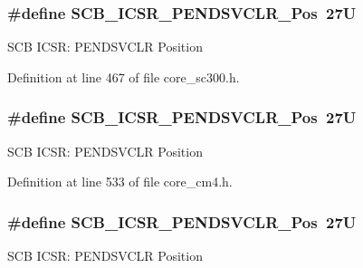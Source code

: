 \subsubsection[{\texorpdfstring{S\+C\+B\+\_\+\+I\+C\+S\+R\+\_\+\+P\+E\+N\+D\+S\+V\+C\+L\+R\+\_\+\+Pos}{SCB_ICSR_PENDSVCLR_Pos}}]{\setlength{\rightskip}{0pt plus 5cm}\#define S\+C\+B\+\_\+\+I\+C\+S\+R\+\_\+\+P\+E\+N\+D\+S\+V\+C\+L\+R\+\_\+\+Pos~27U}\hypertarget{group___c_m_s_i_s___s_c_b_gae218d9022288f89faf57187c4d542ecd}{}\label{group___c_m_s_i_s___s_c_b_gae218d9022288f89faf57187c4d542ecd}
S\+CB I\+C\+SR\+: P\+E\+N\+D\+S\+V\+C\+LR Position 

Definition at line 467 of file core\+\_\+sc300.\+h.

\subsubsection[{\texorpdfstring{S\+C\+B\+\_\+\+I\+C\+S\+R\+\_\+\+P\+E\+N\+D\+S\+V\+C\+L\+R\+\_\+\+Pos}{SCB_ICSR_PENDSVCLR_Pos}}]{\setlength{\rightskip}{0pt plus 5cm}\#define S\+C\+B\+\_\+\+I\+C\+S\+R\+\_\+\+P\+E\+N\+D\+S\+V\+C\+L\+R\+\_\+\+Pos~27U}\hypertarget{group___c_m_s_i_s___s_c_b_gae218d9022288f89faf57187c4d542ecd}{}\label{group___c_m_s_i_s___s_c_b_gae218d9022288f89faf57187c4d542ecd}
S\+CB I\+C\+SR\+: P\+E\+N\+D\+S\+V\+C\+LR Position 

Definition at line 533 of file core\+\_\+cm4.\+h.

\subsubsection[{\texorpdfstring{S\+C\+B\+\_\+\+I\+C\+S\+R\+\_\+\+P\+E\+N\+D\+S\+V\+C\+L\+R\+\_\+\+Pos}{SCB_ICSR_PENDSVCLR_Pos}}]{\setlength{\rightskip}{0pt plus 5cm}\#define S\+C\+B\+\_\+\+I\+C\+S\+R\+\_\+\+P\+E\+N\+D\+S\+V\+C\+L\+R\+\_\+\+Pos~27U}\hypertarget{group___c_m_s_i_s___s_c_b_gae218d9022288f89faf57187c4d542ecd}{}\label{group___c_m_s_i_s___s_c_b_gae218d9022288f89faf57187c4d542ecd}
S\+CB I\+C\+SR\+: P\+E\+N\+D\+S\+V\+C\+LR Position 


